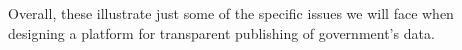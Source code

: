 Overall, these illustrate just some of the specific issues we will face when designing a platform for transparent publishing of government's data.


